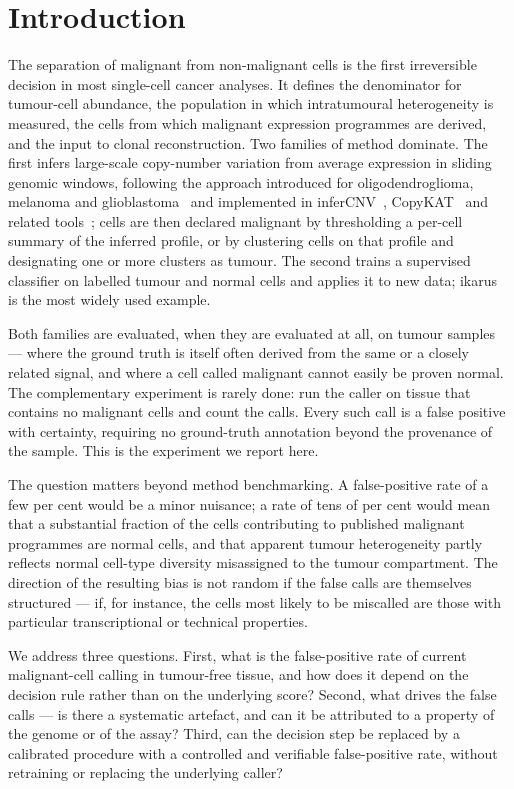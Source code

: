 \documentclass[11pt]{article}
\begin{document}
\section{Introduction}

The separation of malignant from non-malignant cells is the first
irreversible decision in most single-cell cancer analyses. It defines the
denominator for tumour-cell abundance, the population in which intratumoural
heterogeneity is measured, the cells from which malignant expression
programmes are derived, and the input to clonal reconstruction. Two families
of method dominate. The first infers large-scale copy-number variation from
average expression in sliding genomic windows, following the approach
introduced for oligodendroglioma, melanoma and
glioblastoma~\cite{tirosh2016b,tirosh2016,patel2014} and implemented in
inferCNV~\cite{infercnv}, CopyKAT~\cite{copykat} and related
tools~\cite{conics,casper,honeybadger,numbat,scevan}; cells are then declared malignant by thresholding
a per-cell summary of the inferred profile, or by clustering cells on that
profile and designating one or more clusters as tumour. The second trains a
supervised classifier on labelled tumour and normal cells and applies it to
new data; ikarus~\cite{ikarus} is the most widely used example.

Both families are evaluated, when they are evaluated at all, on tumour
samples --- where the ground truth is itself often derived from the same or a
closely related signal, and where a cell called malignant cannot easily be
proven normal. The complementary experiment is rarely done: run the caller on
tissue that contains no malignant cells and count the calls. Every such call
is a false positive with certainty, requiring no ground-truth annotation
beyond the provenance of the sample. This is the experiment we report here.

The question matters beyond method benchmarking. A false-positive rate of a
few per cent would be a minor nuisance; a rate of tens of per cent would mean
that a substantial fraction of the cells contributing to published malignant
programmes are normal cells, and that apparent tumour heterogeneity partly
reflects normal cell-type diversity misassigned to the tumour compartment.
The direction of the resulting bias is not random if the false calls are
themselves structured --- if, for instance, the cells most likely to be
miscalled are those with particular transcriptional or technical properties.

We address three questions. First, what is the false-positive rate of current
malignant-cell calling in tumour-free tissue, and how does it depend on the
decision rule rather than on the underlying score? Second, what drives the
false calls --- is there a systematic artefact, and can it be attributed to a
property of the genome or of the assay? Third, can the decision step be
replaced by a calibrated procedure with a controlled and verifiable
false-positive rate, without retraining or replacing the underlying caller?
\end{document}
